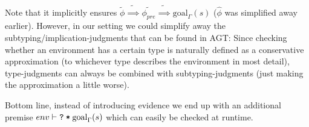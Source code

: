 \documentclass[11pt,a4paper]{article}
\newcommand{\grad}[1]{\widetilde{#1}}
\newcommand{\ttt}{\texttt}
\newcommand{\qm}{\ttt{?}}
\newcommand{\withqm}[1]{\ttt{\qm\:*\:$#1$}}
\newcommand{\goal}{\ensuremath{\textrm{goal}_{\Gamma}}}
\begin{document}
\begin{description}
	Note that it implicitly ensures $\grad{\phi} \grad{\implies} \grad{\phi_{pre}} \grad{\implies} \goal(s)$ ($\hat{\phi}$ was simplified away earlier).
	However, in our setting we could simplify away the subtyping/implication-judgments that can be found in AGT:
	Since checking whether an environment has a certain type is naturally defined as a conservative approximation (to whichever type describes the environment in most detail), type-judgments can always be combined with subtyping-judgments (just making the approximation a little worse).
	
	Bottom line, instead of introducing evidence we end up with an additional premise $env \vdash \withqm{\goal(s)}$ which can easily be checked at runtime.
\end{description}



\end{document}
